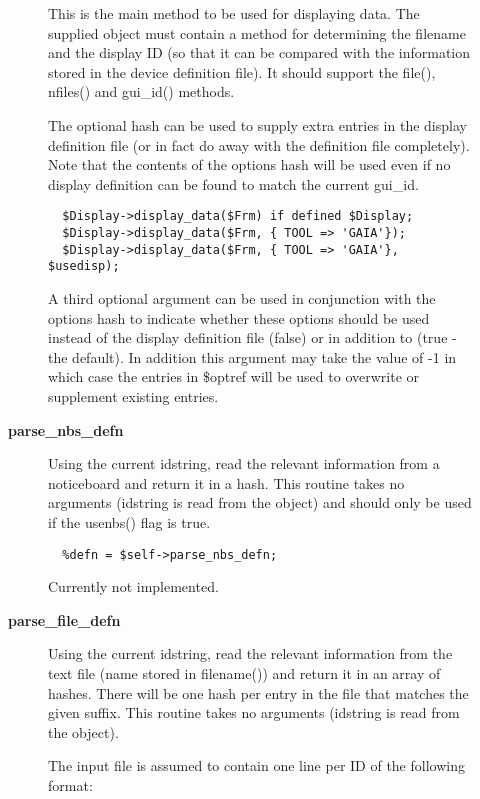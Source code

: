 \begin{description}
\begin{description}
This is the main method to be used for displaying data.  The supplied
object must contain a method for determining the filename and the
display ID (so that it can be compared with the information stored in
the device definition file). It should support the file(), nfiles()
and gui\_id() methods.



The optional hash can be used to supply extra entries in the
display definition file (or in fact do away with the definition file
completely). Note that the contents of the options hash will be used
even if no display definition can be found to match the current
gui\_id.

\begin{verbatim}
  $Display->display_data($Frm) if defined $Display;
  $Display->display_data($Frm, { TOOL => 'GAIA'});
  $Display->display_data($Frm, { TOOL => 'GAIA'}, $usedisp);
\end{verbatim}


A third optional argument can be used in conjunction with the options
hash to indicate whether these options should be used instead of the
display definition file (false) or in addition to (true - the
default). In addition this argument may take the value of -1 in which
case the entries in \$optref will be used to overwrite or supplement
existing entries.


\item[{\textbf{parse\_nbs\_defn}}] \mbox{}

Using the current idstring, read the relevant information from
a noticeboard and return it in a hash. This routine takes no
arguments (idstring is read from the object) and should only
be used if the usenbs() flag is true.

\begin{verbatim}
  %defn = $self->parse_nbs_defn;
\end{verbatim}


Currently not implemented.


\item[{\textbf{parse\_file\_defn}}] \mbox{}

Using the current idstring, read the relevant information from
the text file (name stored in filename()) and return it in an array
of  hashes. There will be one hash per entry in the file that
matches the given suffix.
This routine takes no arguments (idstring is read from the object).



The input file is assumed to contain one line per ID of the following
format:


\end{description}
\end{description}
